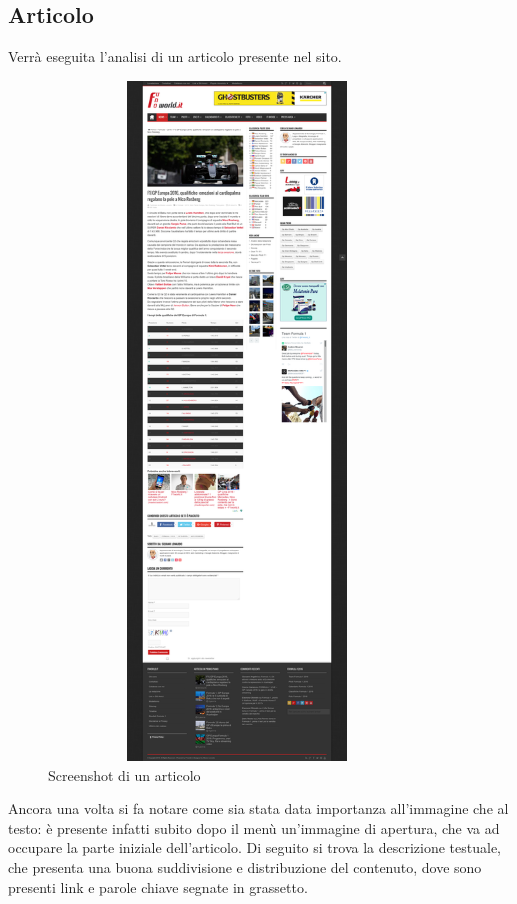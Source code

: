 \subsection{Articolo}
Verr\`a eseguita l'analisi di un articolo presente nel sito.

\begin{figure}[h] %
  \centering
  \includegraphics[height=18cm, width=10cm]{res/img/Article}
  \caption{Screenshot di un articolo}
\end{figure}

Ancora una volta si fa notare come sia stata data importanza all'immagine che al
testo: è presente infatti subito dopo il menù un'immagine di apertura, che va
ad occupare la parte iniziale dell'articolo.
Di seguito si trova la descrizione testuale, che presenta una buona suddivisione
e distribuzione del contenuto, dove sono presenti link e parole chiave segnate
in grassetto.

